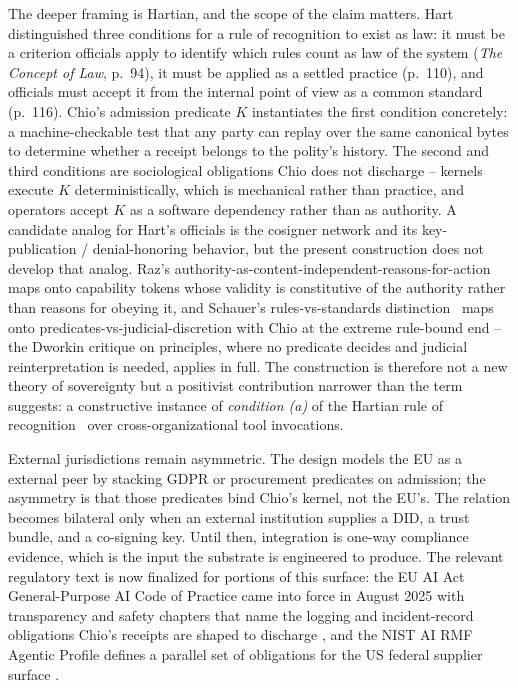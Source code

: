The deeper framing is Hartian, and the scope of the claim matters. Hart distinguished three conditions for a rule of recognition to exist as law: it must be a criterion officials apply to identify which rules count as law of the system (\textit{The Concept of Law}, p.~94), it must be applied as a settled practice (p.~110), and officials must accept it from the internal point of view as a common standard (p.~116). Chio's admission predicate $K$ instantiates the first condition concretely: a machine-checkable test that any party can replay over the same canonical bytes to determine whether a receipt belongs to the polity's history. The second and third conditions are sociological obligations Chio does not discharge -- kernels execute $K$ deterministically, which is mechanical rather than practice, and operators accept $K$ as a software dependency rather than as authority. A candidate analog for Hart's officials is the cosigner network and its key-publication / denial-honoring behavior, but the present construction does not develop that analog. Raz's authority-as-content-independent-reasons-for-action~\cite{razAuthority} maps onto capability tokens whose validity is constitutive of the authority rather than reasons for obeying it, and Schauer's rules-vs-standards distinction~\cite{schauerRules} maps onto predicates-vs-judicial-discretion with Chio at the extreme rule-bound end -- the Dworkin critique on principles, where no predicate decides and judicial reinterpretation is needed, applies in full. The construction is therefore not a new theory of sovereignty but a positivist contribution narrower than the term suggests: a constructive instance of \emph{condition (a)} of the Hartian rule of recognition~\cite{hartLaw} over cross-organizational tool invocations.

External jurisdictions remain asymmetric. The design models the EU as a  external peer by stacking GDPR or procurement predicates on admission; the asymmetry is that those predicates bind Chio's kernel, not the EU's. The relation becomes bilateral only when an external institution supplies a DID, a trust bundle, and a co-signing key. Until then, integration is one-way compliance evidence, which is the input the substrate is engineered to produce. The relevant regulatory text is now finalized for portions of this surface: the EU AI Act General-Purpose AI Code of Practice came into force in August 2025 with transparency and safety chapters that name the logging and incident-record obligations Chio's receipts are shaped to discharge \cite{euAIActGPAICode}, and the NIST AI RMF Agentic Profile defines a parallel set of obligations for the US federal supplier surface \cite{nistAIRMFAgentic}.

